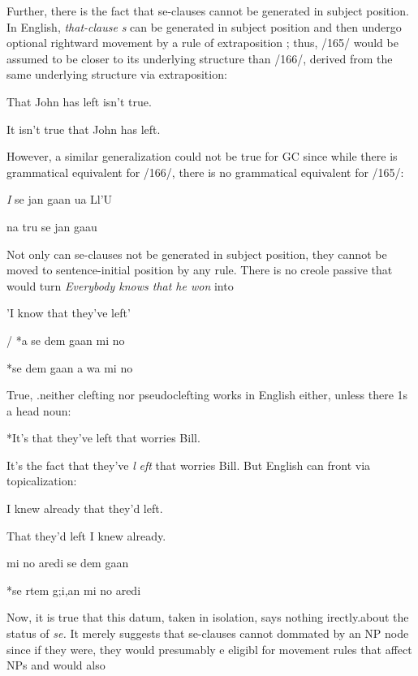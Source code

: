 Further, there is the fact that se-clauses cannot be generated in subject position. In English, \textit{that-clause} \textit{s} can be generated in subject position and then undergo optional rightward movement by a rule of extraposition ; thus, /165/ would be assumed to be closer to its underlying structure than /166/, derived from the same underlying structure via extraposition:

\ea\label{ex:165}
 That John has left isn't true.
\glt
\z

\ea\label{ex:166}
 It isn't true that John has left.
\glt
\z

However, a similar generalization could not be true for GC since while there is grammatical equivalent for /166/, there is no grammatical equivalent for /165/:

\ea\label{ex:167}
\textit{I} se jan gaan ua Ll'U
\glt
\z


\ea\label{ex:168}
 na tru se jan gaau
\glt
\z


Not only can se-clauses not be generated in subject position, they cannot be moved to sentence-initial position by any rule. There is no creole passive that would turn \textit{Everybody knows that he won} into

'I know that they've left'

/\ea\label{ex:173}
 *a se dem gaan mi no
\glt
\z

\ea\label{ex:174}
 *se dem gaan a wa mi no
\glt
\z

True, .neither clefting nor pseudoclefting works in English either, unless there 1s a head noun:

\ea\label{ex:175}
 *It's that they've left that worries Bill.
\glt
\z

\ea\label{ex:176}
 It's the fact that they've \textit{l} \textit{eft} that worries Bill. But English can front via topicalization:
\glt
\z

\ea\label{ex:177}
 I knew already that they'd left.
\glt
\z

\ea\label{ex:178}
 That they'd left I knew already.
\glt
\z

\ea\label{ex:179}
 mi no aredi se dem gaan
\glt
\z

\ea\label{ex:180}
 *se rtem g;i,an mi no aredi
\glt
\z

Now, it is true that this datum, taken in isolation, says nothing irectly.about the status of \textit{se.} It merely suggests that se-clauses cannot dommated by an NP node since if they were, they would presumably e eligibl for movement rules that affect NPs and would also

